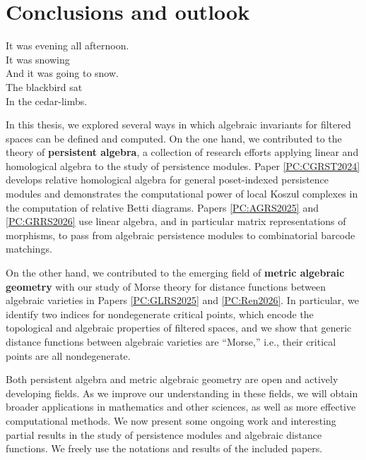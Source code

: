 
\chapter{Conclusions and outlook}
\label{C:outlook}

\begin{epigraph}
  It was evening all afternoon. \\
  It was snowing \\
  And it was going to snow. \\
  The blackbird sat \\
  In the cedar-limbs.
\end{epigraph}

In this thesis, we explored several ways in which algebraic invariants for filtered spaces can be defined and computed. On the one hand, we contributed to the theory of \textbf{persistent algebra}, a collection of research efforts applying linear and homological algebra to the study of persistence modules. Paper \ref{PC:CGRST2024} develops relative homological algebra for general poset-indexed persistence modules and demonstrates the computational power of local Koszul complexes in the computation of relative Betti diagrams. Papers \ref{PC:AGRS2025} and \ref{PC:GRRS2026} use linear algebra, and in particular matrix representations of morphisms, to pass from algebraic persistence modules to combinatorial barcode matchings.

On the other hand, we contributed to the emerging field of \textbf{metric algebraic geometry} with our study of Morse theory for distance functions between algebraic varieties in Papers \ref{PC:GLRS2025} and \ref{PC:Ren2026}. In particular, we identify two indices for nondegenerate critical points, which encode the topological and algebraic properties of filtered spaces, and we show that generic distance functions between algebraic varieties are ``Morse,'' i.e., their critical points are all nondegenerate.

Both persistent algebra and metric algebraic geometry are open and actively developing fields. As we improve our understanding in these fields, we will obtain broader applications in mathematics and other sciences, as well as more effective computational methods. We now present some ongoing work and interesting partial results in the study of persistence modules and algebraic distance functions. We freely use the notations and results of the included papers.

